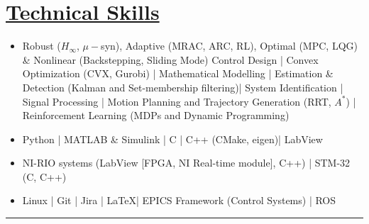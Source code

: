 \section*{\underline{Technical Skills}}
\begin{itemize}
        \item[\itbf{Control and Estimation:}] Robust ($H_\infty$, $\mu-$syn), Adaptive (MRAC, ARC, RL), Optimal (MPC, LQG) \& Nonlinear (Backstepping, Sliding Mode) Control Design |
        Convex Optimization (CVX, Gurobi) | Mathematical Modelling |
        Estimation \& Detection (Kalman and Set-membership filtering)|
        System Identification | Signal Processing |
        Motion Planning and Trajectory Generation (RRT, $A^*$) |
        Reinforcement Learning (MDPs and Dynamic Programming)
        \item[\itbf{Programming:}] Python | MATLAB \& Simulink | C | C++ (CMake, eigen)| LabView
        \item[\itbf{Embedded Systems:}] NI-RIO systems (LabView [FPGA, NI Real-time module], C++) | STM-32 (C, C++)
        \item[\itbf{OS \& Tools:}] Linux | Git | Jira | \LaTeX | EPICS Framework (Control Systems) | ROS
\end{itemize}
\noindent\rule{\textwidth}{0.4pt}

